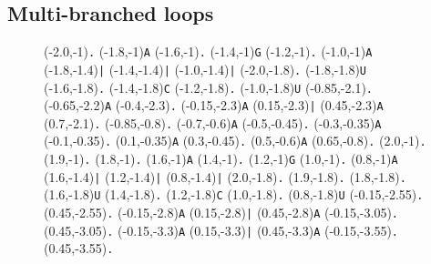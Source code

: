 \documentclass{article}
\begin{document}
  \subsection{Multi-branched loops}
  
  \begin{figure}[t]
    \centering
    \vskip 0.5cm
    (-2.0,-1){\texttt{.}}
    (-1.8,-1){\texttt{A}}
    (-1.6,-1){\texttt{.}}
    (-1.4,-1){\texttt{G}}
    (-1.2,-1){\texttt{.}}
    (-1.0,-1){\texttt{A}}
    (-1.8,-1.4){\texttt{|}}
    (-1.4,-1.4){\texttt{|}}
    (-1.0,-1.4){\texttt{|}}
    (-2.0,-1.8){\texttt{.}}
    (-1.8,-1.8){\texttt{U}}
    (-1.6,-1.8){\texttt{.}}
    (-1.4,-1.8){\texttt{C}}
    (-1.2,-1.8){\texttt{.}}
    (-1.0,-1.8){\texttt{U}}
%
    (-0.85,-2.1){\texttt{.}}
    (-0.65,-2.2){\texttt{A}}
    (-0.4,-2.3){\texttt{.}}
    (-0.15,-2.3){\texttt{A}}
    (0.15,-2.3){\texttt{|}}
    (0.45,-2.3){\texttt{A}}
    (0.7,-2.1){\texttt{.}}
%
    (-0.85,-0.8){\texttt{.}}
    (-0.7,-0.6){\texttt{A}}
    (-0.5,-0.45){\texttt{.}}
    (-0.3,-0.35){\texttt{A}}
    (-0.1,-0.35){\texttt{.}}
    (0.1,-0.35){\texttt{A}}
    (0.3,-0.45){\texttt{.}}
    (0.5,-0.6){\texttt{A}}
    (0.65,-0.8){\texttt{.}}
%
    (2.0,-1){\texttt{.}}
    (1.9,-1){\texttt{.}}
    (1.8,-1){\texttt{.}}
    (1.6,-1){\texttt{A}}
    (1.4,-1){\texttt{.}}
    (1.2,-1){\texttt{G}}
    (1.0,-1){\texttt{.}}
    (0.8,-1){\texttt{A}}
    (1.6,-1.4){\texttt{|}}
    (1.2,-1.4){\texttt{|}}
    (0.8,-1.4){\texttt{|}}
    (2.0,-1.8){\texttt{.}}
    (1.9,-1.8){\texttt{.}}
    (1.8,-1.8){\texttt{.}}
    (1.6,-1.8){\texttt{U}}
    (1.4,-1.8){\texttt{.}}
    (1.2,-1.8){\texttt{C}}
    (1.0,-1.8){\texttt{.}}
    (0.8,-1.8){\texttt{U}}
%
    (-0.15,-2.55){\texttt{.}}
    (0.45,-2.55){\texttt{.}}
    (-0.15,-2.8){\texttt{A}}
    (0.15,-2.8){\texttt{|}}
    (0.45,-2.8){\texttt{A}}
    (-0.15,-3.05){\texttt{.}}
    (0.45,-3.05){\texttt{.}}
    (-0.15,-3.3){\texttt{A}}
    (0.15,-3.3){\texttt{|}}
    (0.45,-3.3){\texttt{A}}
    (-0.15,-3.55){\texttt{.}}
    (0.45,-3.55){\texttt{.}}

\end{figure}
\end{document}
